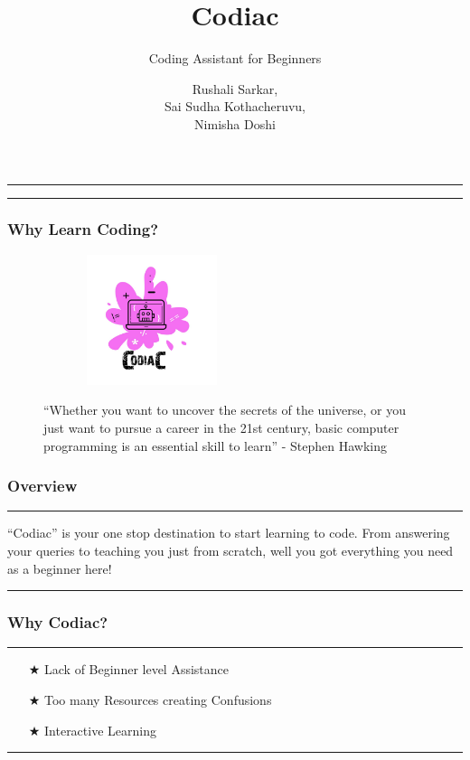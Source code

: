 \documentclass[14pt]{beamer}
\title[Codiac]{Codiac}
\subtitle[Coding Assitant]{Coding Assistant for Beginners}
\author[Team 2]{Rushali Sarkar, \\ Sai Sudha Kothacheruvu, \\ Nimisha Doshi}
\begin{document}
\begin{frame}
    \noindent
    {\color{pink} \rule{\linewidth}{0.7mm} }
    \titlepage
    \noindent
    {\color{pink} \rule{\linewidth}{0.7mm} }
\end{frame}


\begin{frame}
    \frametitle{Why Learn Coding?}
    \begin{figure}[htbp]
        \centerline{\includegraphics[width=2.5in, height=1.5in]{./Codiac/logos/logo.jpeg}}
        \begin{spacing}{0.25}
        {\small 
        ``Whether you want to uncover the secrets of the universe, 
        or you just want to pursue a career in the 21st century, 
        basic computer programming is an essential skill to learn'' 
        \linebreak - Stephen Hawking}
        \end{spacing}
    \end{figure}
\end{frame}


\begin{frame}
    \frametitle{Overview}
    \noindent
    {\color{pink} \rule{\linewidth}{0.7mm} }
    ``Codiac'' is your one stop destination to start learning to code. From answering your queries to teaching you just from scratch, well you got everything you need as a beginner here!
    \noindent
    {\color{pink} \rule{\linewidth}{0.7mm} }
\end{frame}

\begin{frame}
    \frametitle{Why Codiac?}
    \noindent
    {\color{pink} \rule{\linewidth}{0.7mm} }
    \begin{itemize}
    \item [$\bigstar$] Lack of Beginner level Assistance \\
        \pause
    \item [$\bigstar$] Too many Resources creating Confusions \\
        \pause
   \item [$\bigstar$] Interactive Learning \\
    \end{itemize}
    \noindent
     {\color{pink} \rule{\linewidth}{0.7mm}}
\end{frame}
\end{document}
